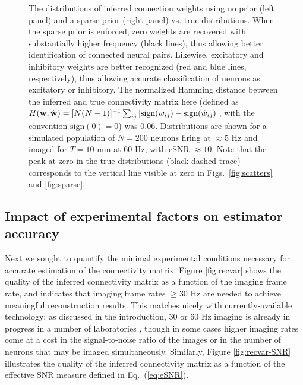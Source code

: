 \documentclass[aoas,preprint]{imsart}
\begin{document}
\begin{figure}[t!]
\begin{minipage}[c]{0.45\hsize}
\end{minipage}
\caption{The distributions of inferred connection weights using no
prior (left panel) and a sparse prior (right panel) vs. true
distributions. When the sparse prior is enforced, zero weights are
recovered with substantially higher frequency (black lines), thus
allowing better identification of connected neural pairs. Likewise,
excitatory and inhibitory weights are better recognized (red and blue
lines, respectively), thus allowing accurate classification of neurons
as excitatory or inhibitory.  The normalized Hamming distance between
the inferred and true connectivity matrix here (defined as $H({\bf w},
\hat {\bf w}) = [N (N-1)]^{-1} \sum_{ij} |\text{sign} (w_{ij}) -
\text{sign} (\hat w_{ij})|$, with the convention $\text{sign}(0)=0$)
was $0.06$.  Distributions are shown for a simulated population of
$N=200$ neurons firing at $\approx 5$ Hz and imaged for $T=10$ min at
$60$ Hz, with eSNR $\approx 10$.  Note that the peak at zero in the
true distributions (black dashed trace) corresponds to the vertical
line visible at zero in Figs.~\ref{fig:scatters} and
\ref{fig:sparse}.}
\label{fig:distros}
\end{figure}


\subsection{Impact of experimental factors on estimator accuracy}\label{sec:results-parm}

Next we sought to quantify the minimal experimental conditions
necessary for accurate estimation of the connectivity matrix.  Figure
\ref{fig:recvar} shows the quality of the inferred connectivity matrix
as a function of the imaging frame rate, and indicates that imaging
frame rates $\geq 30$ Hz are needed to achieve meaningful
reconstruction results.  This matches nicely with currently-available
technology; as discussed in the introduction, $30$ or $60$ Hz imaging
is already in progress in a number of laboratories
\cite{NguyenParker01,Iyer06,SalomeBourdieu06,ReddySaggau08}, though in
some cases higher imaging rates come at a cost in the signal-to-noise
ratio of the images or in the number of neurons that may be imaged
simultaneously.  Similarly, Figure \ref{fig:recvar-SNR} illustrates
the quality of the inferred connectivity matrix as a function of the
effective SNR measure defined in Eq.~(\ref{eq:eSNR}).
\end{document}
